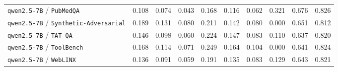 \begin{longtable}{lccccccccc}
\texttt{qwen2.5-7B} / \texttt{PubMedQA} & 0.108 & 0.074 & 0.043 & 0.168 & 0.116 & 0.062 & 0.321 & 0.676 & 0.826 \\
\texttt{qwen2.5-7B} / \texttt{Synthetic-Adversarial} & 0.189 & 0.131 & 0.080 & 0.211 & 0.142 & 0.080 & 0.000 & 0.651 & 0.812 \\
\texttt{qwen2.5-7B} / \texttt{TAT-QA} & 0.146 & 0.098 & 0.060 & 0.224 & 0.147 & 0.083 & 0.110 & 0.637 & 0.820 \\
\texttt{qwen2.5-7B} / \texttt{ToolBench} & 0.168 & 0.114 & 0.071 & 0.249 & 0.164 & 0.104 & 0.000 & 0.641 & 0.824 \\
\texttt{qwen2.5-7B} / \texttt{WebLINX} & 0.136 & 0.091 & 0.059 & 0.191 & 0.135 & 0.083 & 0.129 & 0.643 & 0.821 \\
\bottomrule
\end{longtable}
